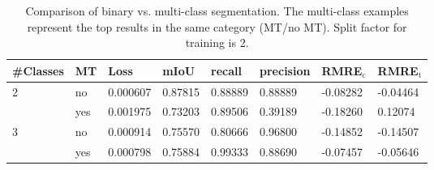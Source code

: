 \begin{table}[htbp]
    \centering
    \begin{tabular}{llllllll}
        \toprule
        \#Classes & MT  & Loss     & mIoU    & recall  & precision & RMRE$_\text{c}$ & RMRE$_\text{t}$ \\ \midrule
        2         & no  & 0.000607 & 0.87815 & 0.88889 & 0.88889   & -0.08282        & -0.04464        \\
                  & yes & 0.001975 & 0.73203 & 0.89506 & 0.39189   & -0.18260        & \phantom{-}0.12074         \\
        3         & no  & 0.000914 & 0.75570 & 0.80666 & 0.96800   & -0.14852        & -0.14507        \\
                  & yes & 0.000798 & 0.75884 & 0.99333 & 0.88690   & -0.07457        & -0.05646        \\ \bottomrule
        \end{tabular}
    \vspace{0.2cm}
    \caption{Comparison of binary vs. multi-class segmentation. The multi-class examples represent the top results in the same category (MT/no MT). Split factor for training is 2.}
    \label{tab:binary_labels}
\end{table}
